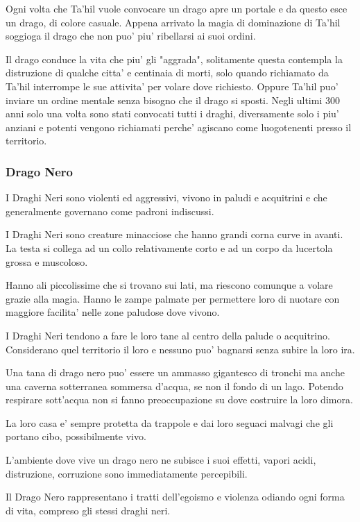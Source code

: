 \documentclass[a4paper,11pt,twoside,openany]{book}
\begin{document}
Ogni volta che Ta'hil vuole convocare un drago apre un portale e da questo esce un drago, di colore casuale. Appena arrivato la magia di dominazione di Ta'hil soggioga il drago che non puo' piu' ribellarsi ai suoi ordini.

Il drago conduce la vita che piu' gli "aggrada", solitamente questa contempla la distruzione di qualche citta' e centinaia di morti, solo quando richiamato da Ta'hil interrompe le sue attivita' per volare dove richiesto. Oppure Ta'hil puo' inviare un ordine mentale senza bisogno che il drago si sposti.
Negli ultimi 300 anni solo una volta sono stati convocati tutti i draghi, diversamente solo i piu' anziani e potenti vengono richiamati perche' agiscano come luogotenenti presso il territorio.

\subsubsection{Drago Nero} 

I Draghi Neri sono violenti ed aggressivi, vivono in paludi e acquitrini e che generalmente governano come padroni indiscussi.

I Draghi Neri sono creature minacciose che hanno grandi corna curve in avanti.
La testa si collega ad un collo relativamente corto e ad un corpo da lucertola grossa e muscoloso.

Hanno ali piccolissime che si trovano sui lati, ma riescono comunque a volare grazie alla magia.
Hanno le zampe palmate per permettere loro di nuotare con maggiore facilita' nelle zone paludose dove vivono.

I Draghi Neri tendono a fare le loro tane al centro della palude o acquitrino.
Considerano quel territorio il loro e nessuno puo' bagnarsi senza subire la loro ira.

Una tana di drago nero puo' essere un ammasso gigantesco di tronchi ma anche una caverna sotterranea sommersa d'acqua, se non il fondo di un lago.
Potendo respirare sott'acqua non si fanno preoccupazione su dove costruire la loro dimora.

La loro casa e' sempre protetta da trappole e dai loro seguaci malvagi che gli portano cibo, possibilmente vivo.

L'ambiente dove vive un drago nero ne subisce i suoi effetti, vapori acidi, distruzione, corruzione sono immediatamente percepibili.

Il Drago Nero rappresentano i tratti dell'egoismo e violenza odiando ogni forma di vita, compreso gli stessi draghi neri.
\end{document}
